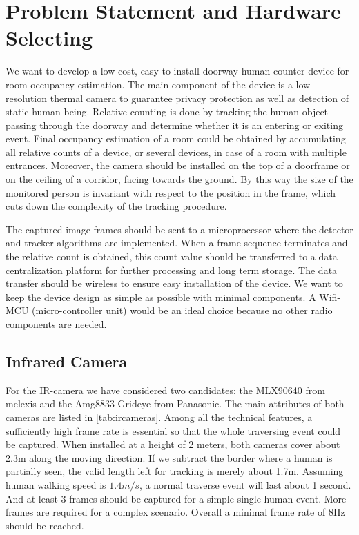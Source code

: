 \chapter{Problem Statement and Hardware Selecting} \label{ch:hardware}
We want to develop a low-cost, easy to install doorway human counter device for room occupancy estimation. The main component of the device is a low-resolution thermal camera to guarantee privacy protection as well as detection of static human being. Relative counting is done by tracking the human object passing through the doorway and determine whether it is an entering or exiting event. Final occupancy estimation of a room could be obtained by accumulating all relative counts of a device, or several devices, in case of a room with multiple entrances. Moreover, the camera should be installed on the top of a doorframe or on the ceiling of a corridor, facing towards the ground. By this way the size of the monitored person is invariant with respect to the position in the frame, which cuts down the complexity of the tracking procedure.

The captured image frames should be sent to a microprocessor where the detector and tracker algorithms are implemented. When a frame sequence terminates and the relative count is obtained, this count value should be transferred to a data centralization platform for further processing and long term storage. The data transfer should be wireless to ensure easy installation of the device. We want to keep the device design as simple as possible with minimal components. A Wifi-MCU (micro-controller unit) would be an ideal choice because no other radio components are needed.
\section{Infrared Camera}
For the IR-camera we have considered two candidates: the MLX90640 from melexis and the Amg8833 Grideye from Panasonic. The main attributes of both cameras are listed in \autoref{tab:ircameras}. Among all the technical features, a sufficiently high frame rate is essential so that the whole traversing event could be captured. When installed at a height of 2 meters, both cameras cover about 2.3m along the moving direction. If we subtract the border where a human is partially seen, the valid length left for tracking is merely about 1.7m. Assuming human walking speed is $1.4m/s$, a normal traverse event will last about 1 second. And at least 3 frames should be captured for a simple single-human event. More frames are required for a complex scenario. Overall a minimal frame rate of 8Hz should be reached.

